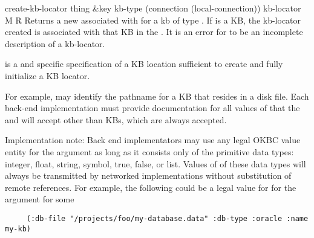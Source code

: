 \begin{okbcop}{create-kb-locator}{ thing \&key kb-type (connection (local-connection))} { kb-locator } { M } { R } {  }
Returns a new  associated with  for a kb of
   type .  If  is a KB, the kb-locator created is
   associated with that KB in the .  It is an error for
    to be an incomplete description of a kb-locator.

    is a  and  specific
   specification of a KB location sufficient to create and fully
   initialize a KB locator.

   For example,  may identify the pathname for a KB that
   resides in a disk file.  Each back-end implementation must provide
   documentation for all values of  that the 
   and  will accept other than KBs, which are always
   accepted.

   Implementation note: Back end implementators may use any legal
   OKBC value entity for the  argument as long as it
   consists only of the primitive data types: integer, float, string,
   symbol, true, false, or list.  Values of  of these data
   types will always be transmitted by networked implementations without
   substitution of remote references.  For example, the following
   could be a legal value for for the  argument for some
   \begin{verbatim}
     (:db-file "/projects/foo/my-database.data" :db-type :oracle :name my-kb)
   \end{verbatim}
\end{okbcop}

